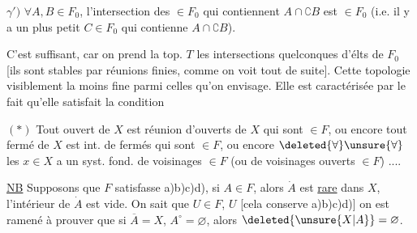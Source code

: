 
$\gamma')$ $\forall A,B\in F_0$, l'intersection des $\in F_0$ qui contiennent $A\cap\complement B$ est $\in F_0$ (i.e. il y a un plus petit $C\in F_0$ qui contienne $A\cap\complement B$).

C'est suffisant, car on prend la top. $T$  les intersections quelconques d'élts de $F_0$ [ils sont stables par réunions finies, comme on voit tout de suite]. Cette topologie   visiblement la moins fine parmi celles qu'on envisage. Elle est caractérisée par le fait qu'elle satisfait la condition

 $(*)$ Tout ouvert de $X$ est réunion d'ouverts de $X$ qui sont $\in F$, ou encore tout fermé de $X$ est int. de fermés qui sont $\in F$, ou encore $\deleted{\forall}\unsure{\forall}$ les $x\in X$ a un syst. fond. de voisinages $\in F$ (ou de voisinages ouverts $\in F$) ....


\uline{NB} Supposons que $F$ satisfasse a)b)c)d),   si $A\in F$, alors $\dot A$  est \uline{rare} dans $X$,  l'intérieur  de $\dot A$ est vide. On sait que $U\in F$,  $U$ [cela conserve a)b)c)d)] on est ramené à prouver que si $\overline A=X$, $A^\circ=\varnothing$, alors $\deleted{\unsure{X|A}}=\varnothing$. 

